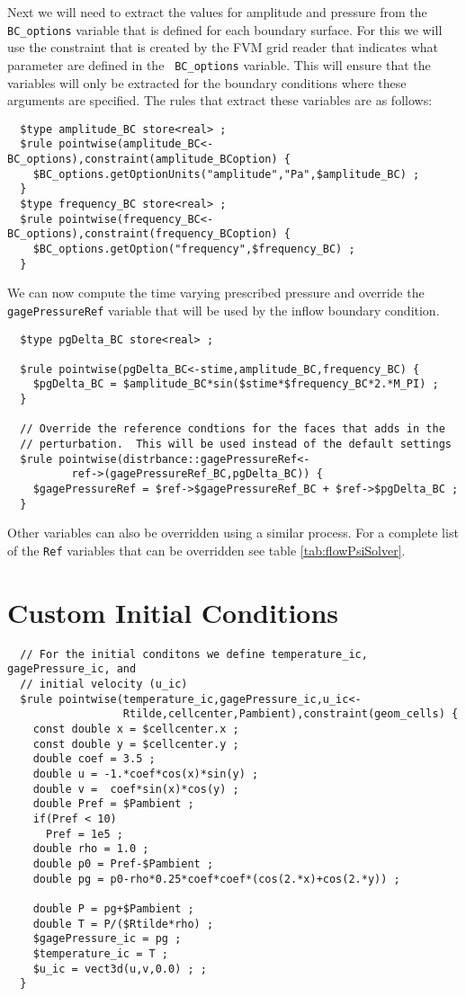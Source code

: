 \documentclass[letterpaper,twoside]{article}
\begin{document}
Next we will need to extract the values for amplitude and pressure
from the {\tt BC\_options} variable that is defined for each boundary
surface.  For this we will use the constraint that is created by the
FVM grid reader that indicates what parameter are defined in the {\tt
  BC\_options} variable.  This will ensure that the variables will
only be extracted for the boundary conditions where these arguments
are specified.  The rules that extract these variables are as follows:
\begin{verbatim}
  $type amplitude_BC store<real> ;
  $rule pointwise(amplitude_BC<-BC_options),constraint(amplitude_BCoption) {
    $BC_options.getOptionUnits("amplitude","Pa",$amplitude_BC) ;
  }
  $type frequency_BC store<real> ;
  $rule pointwise(frequency_BC<-BC_options),constraint(frequency_BCoption) {
    $BC_options.getOption("frequency",$frequency_BC) ;
  }
\end{verbatim}
 
We can now compute the time varying prescribed pressure and override
the {\tt gagePressureRef} variable that will be used by the inflow
boundary condition.
\begin{verbatim}
  $type pgDelta_BC store<real> ;

  $rule pointwise(pgDelta_BC<-stime,amplitude_BC,frequency_BC) {
    $pgDelta_BC = $amplitude_BC*sin($stime*$frequency_BC*2.*M_PI) ;
  }

  // Override the reference condtions for the faces that adds in the
  // perturbation.  This will be used instead of the default settings
  $rule pointwise(distrbance::gagePressureRef<-
		  ref->(gagePressureRef_BC,pgDelta_BC)) { 
    $gagePressureRef = $ref->$gagePressureRef_BC + $ref->$pgDelta_BC ;
  }
\end{verbatim}

Other variables can also be overridden using a similar process.  For a
complete list of the {\tt Ref} variables that can be overridden see
table \ref{tab:flowPsiSolver}.

\clearpage
\section{Custom Initial Conditions}
\begin{verbatim}
  // For the initial conditons we define temperature_ic, gagePressure_ic, and
  // initial velocity (u_ic)
  $rule pointwise(temperature_ic,gagePressure_ic,u_ic<-
                  Rtilde,cellcenter,Pambient),constraint(geom_cells) {
    const double x = $cellcenter.x ;
    const double y = $cellcenter.y ;
    double coef = 3.5 ;
    double u = -1.*coef*cos(x)*sin(y) ;
    double v =  coef*sin(x)*cos(y) ;
    double Pref = $Pambient ;
    if(Pref < 10)
      Pref = 1e5 ;
    double rho = 1.0 ;
    double p0 = Pref-$Pambient ;
    double pg = p0-rho*0.25*coef*coef*(cos(2.*x)+cos(2.*y)) ;

    double P = pg+$Pambient ;
    double T = P/($Rtilde*rho) ;
    $gagePressure_ic = pg ;
    $temperature_ic = T ;
    $u_ic = vect3d(u,v,0.0) ; ;
  }
\end{verbatim}
\clearpage
\end{document}
